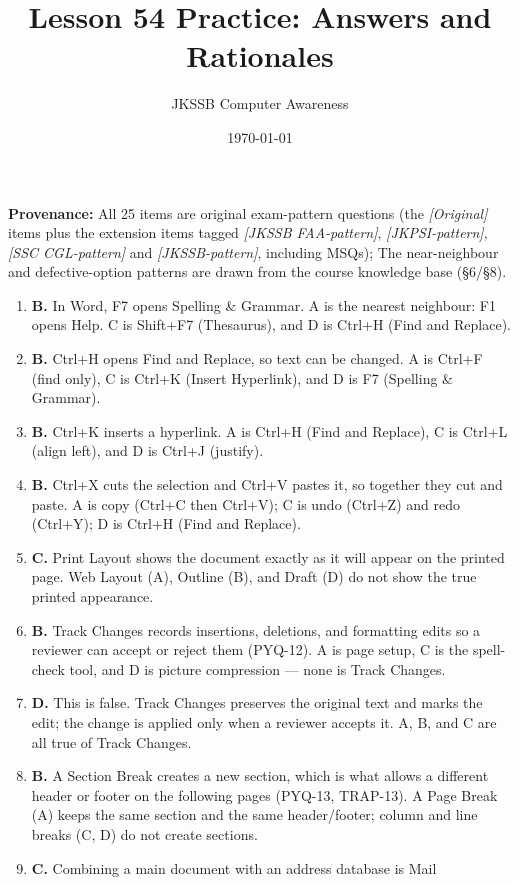 \documentclass[11pt]{article}
\title{Lesson 54 Practice: Answers and Rationales}
\author{JKSSB Computer Awareness}
\date{\today}
\begin{document}
\maketitle
\noindent\textbf{Provenance:} All 25 items are original exam-pattern questions (the \textit{[Original]} items plus the extension items tagged \textit{[JKSSB FAA-pattern]}, \textit{[JKPSI-pattern]}, \textit{[SSC CGL-pattern]} and \textit{[JKSSB-pattern]}, including MSQs); The near-neighbour and defective-option patterns are drawn from the course knowledge base (\S6/\S8).

\begin{enumerate}[label=\textbf{Q\arabic*.}, leftmargin=*]
\item \textbf{B.} In Word, F7 opens Spelling \& Grammar. A is the nearest
  neighbour: F1 opens Help. C is Shift+F7 (Thesaurus), and D is Ctrl+H (Find
  and Replace).
\item \textbf{B.} Ctrl+H opens Find and Replace, so text can be changed. A is
  Ctrl+F (find only), C is Ctrl+K (Insert Hyperlink), and D is F7 (Spelling
  \& Grammar).
\item \textbf{B.} Ctrl+K inserts a hyperlink. A is Ctrl+H (Find and Replace),
  C is Ctrl+L (align left), and D is Ctrl+J (justify).
\item \textbf{B.} Ctrl+X cuts the selection and Ctrl+V pastes it, so together
  they cut and paste. A is copy (Ctrl+C then Ctrl+V); C is undo
  (Ctrl+Z) and redo (Ctrl+Y); D is Ctrl+H (Find and Replace).
\item \textbf{C.} Print Layout shows the document exactly as it will appear on
  the printed page. Web Layout (A), Outline (B), and Draft (D) do not show the
  true printed appearance.
\item \textbf{B.} Track Changes records insertions, deletions, and formatting
  edits so a reviewer can accept or reject them (PYQ-12). A is page setup, C
  is the spell-check tool, and D is picture compression --- none is Track
  Changes.
\item \textbf{D.} This is false. Track Changes preserves the original text and
  marks the edit; the change is applied only when a reviewer accepts it. A, B,
  and C are all true of Track Changes.
\item \textbf{B.} A Section Break creates a new section, which is what allows a
  different header or footer on the following pages (PYQ-13, TRAP-13). A Page
  Break (A) keeps the same section and the same header/footer; column and line
  breaks (C, D) do not create sections.
\item \textbf{C.} Combining a main document with an address database is Mail

\end{enumerate}
\end{document}
